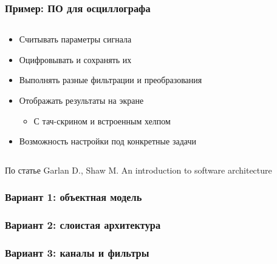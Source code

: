 \documentclass{../mcsslides}
\begin{document}
    \begin{frame}
        \frametitle{Пример: ПО для осциллографа}
        \begin{columns}
            \begin{column}{0.6\textwidth}
                \begin{itemize}
                    \item Считывать параметры сигнала
                    \item Оцифровывать и сохранять их
                    \item Выполнять разные фильтрации и преобразования
                    \item Отображать результаты на экране
                    \begin{itemize}
                        \item С тач-скрином и встроенным хелпом
                    \end{itemize}
                    \item Возможность настройки под конкретные задачи
                \end{itemize}
            \end{column}
            \begin{column}{0.4\textwidth}
            \end{column}
        \end{columns}
        \vspace{1cm}
        \begin{tiny}
            По статье Garlan D., Shaw M. An introduction to software architecture
        \end{tiny}
    \end{frame}

    \begin{frame}
        \frametitle{Вариант 1: объектная модель}
    \end{frame}

    \begin{frame}
        \frametitle{Вариант 2: слоистая архитектура}
    \end{frame}

    \begin{frame}
        \frametitle{Вариант 3: каналы и фильтры}
    \end{frame}
\end{document}
